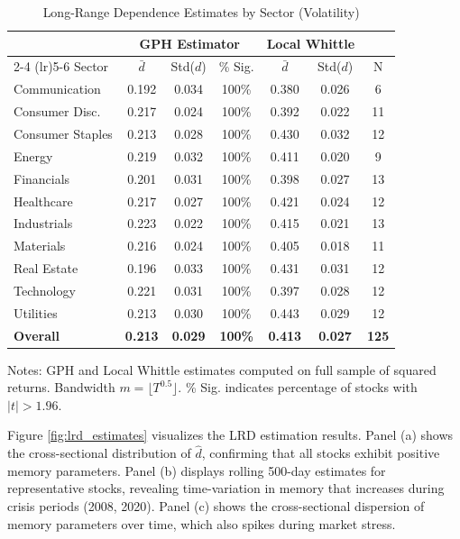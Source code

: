 \documentclass[12pt,a4paper]{article}
\begin{document}
\begin{table}[htbp]
\centering
\caption{Long-Range Dependence Estimates by Sector (Volatility)}
\label{tab:lrd_estimates}
\small
\begin{tabular}{lcccccc}
\toprule
 & \multicolumn{3}{c}{GPH Estimator} & \multicolumn{2}{c}{Local Whittle} & \\
\cmidrule(lr){2-4} \cmidrule(lr){5-6}
Sector & $\bar{d}$ & Std($d$) & \% Sig. & $\bar{d}$ & Std($d$) & N \\
\midrule
Communication & 0.192 & 0.034 & 100\% & 0.380 & 0.026 & 6 \\
Consumer Disc. & 0.217 & 0.024 & 100\% & 0.392 & 0.022 & 11 \\
Consumer Staples & 0.213 & 0.028 & 100\% & 0.430 & 0.032 & 12 \\
Energy & 0.219 & 0.032 & 100\% & 0.411 & 0.020 & 9 \\
Financials & 0.201 & 0.031 & 100\% & 0.398 & 0.027 & 13 \\
Healthcare & 0.217 & 0.027 & 100\% & 0.421 & 0.024 & 12 \\
Industrials & 0.223 & 0.022 & 100\% & 0.415 & 0.021 & 13 \\
Materials & 0.216 & 0.024 & 100\% & 0.405 & 0.018 & 11 \\
Real Estate & 0.196 & 0.033 & 100\% & 0.431 & 0.031 & 12 \\
Technology & 0.221 & 0.031 & 100\% & 0.397 & 0.028 & 12 \\
Utilities & 0.213 & 0.030 & 100\% & 0.443 & 0.029 & 12 \\
\midrule
\textbf{Overall} & \textbf{0.213} & \textbf{0.029} & \textbf{100\%} & \textbf{0.413} & \textbf{0.027} & \textbf{125} \\
\bottomrule
\end{tabular}
\begin{tablenotes}\small
\item Notes: GPH and Local Whittle estimates computed on full sample of squared returns. Bandwidth $m = \lfloor T^{0.5} \rfloor$. \% Sig. indicates percentage of stocks with $|t| > 1.96$.
\end{tablenotes}
\end{table}

Figure \ref{fig:lrd_estimates} visualizes the LRD estimation results. Panel (a) shows the cross-sectional distribution of $\hat{d}$, confirming that all stocks exhibit positive memory parameters. Panel (b) displays rolling 500-day estimates for representative stocks, revealing time-variation in memory that increases during crisis periods (2008, 2020). Panel (c) shows the cross-sectional dispersion of memory parameters over time, which also spikes during market stress.
\end{document}
